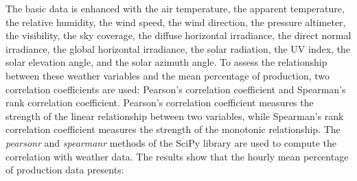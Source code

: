 The basic data is enhanced with the air temperature, the apparent temperature, the relative humidity, the wind speed, the wind direction, the pressure altimeter, the visibility, the sky coverage, the diffuse horizontal irradiance, the direct normal irradiance, the global horizontal irradiance, the solar radiation, the UV index, the solar elevation angle, and the solar azimuth angle.
To assess the relationship between these weather variables and the mean percentage of production, two correlation coefficients are used: Pearson's correlation coefficient and Spearman's rank correlation coefficient.
Pearson's correlation coefficient measures the strength of the linear relationship between two variables, while Spearman's rank correlation coefficient measures the strength of the monotonic relationship.
The \emph{pearsonr} and \emph{spearmanr} methods of the SciPy library are used to compute the correlation with weather data.
The results show that the hourly mean percentage of production data presents:

